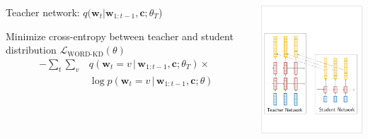 \documentclass{beamer}
\newcommand{\air}{\vspace{0.25cm}}
\newcommand{\given}{\,|\,}
\newcommand{\wvec}{\mathbf{w}}
\newcommand{\cvec}{\mathbf{c}}
\begin{document}
\begin{frame}


\centerline{}
\air 
\begin{columns}
\begin{column}{6.5cm}

Teacher network: $q(\wvec_{t} | \wvec_{1:t-1}, \cvec  ; \theta_T$)  
\air 

Minimize cross-entropy between teacher and student distribution  $\mathcal{L}_{\text{WORD-KD}}(\theta)$ \\

\begin{align*}
-\sum_t \sum_v &q(\wvec_t=v \given \wvec_{1: t-1}, \cvec ; \theta_T)\times \\
& \log p(\wvec_t =v \given \wvec_{1: t-1}, \cvec ; \theta)
\end{align*}
\end{column}

\begin{column}{5.5cm}
\includegraphics[width=5.5cm]{word-kd-2}
\end{column}
\end{columns}
\end{frame}

\end{document}
